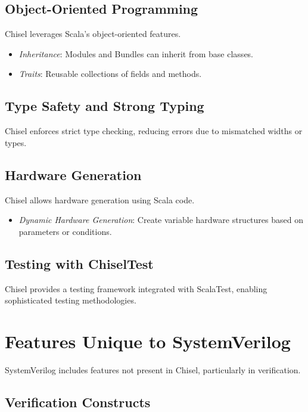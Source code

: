\subsection{Object-Oriented Programming}

Chisel leverages Scala's object-oriented features.

\begin{itemize}
    \item \textit{Inheritance}: Modules and Bundles can inherit from base classes.
    \item \textit{Traits}: Reusable collections of fields and methods.
\end{itemize}

\subsection{Type Safety and Strong Typing}

Chisel enforces strict type checking, reducing errors due to mismatched widths or types.

\subsection{Hardware Generation}

Chisel allows hardware generation using Scala code.

\begin{itemize}
    \item \textit{Dynamic Hardware Generation}: Create variable hardware structures based on parameters or conditions.
\end{itemize}

\subsection{Testing with ChiselTest}

Chisel provides a testing framework integrated with ScalaTest, enabling sophisticated testing methodologies.

\section{Features Unique to SystemVerilog}

SystemVerilog includes features not present in Chisel, particularly in verification.

\subsection{Verification Constructs}

